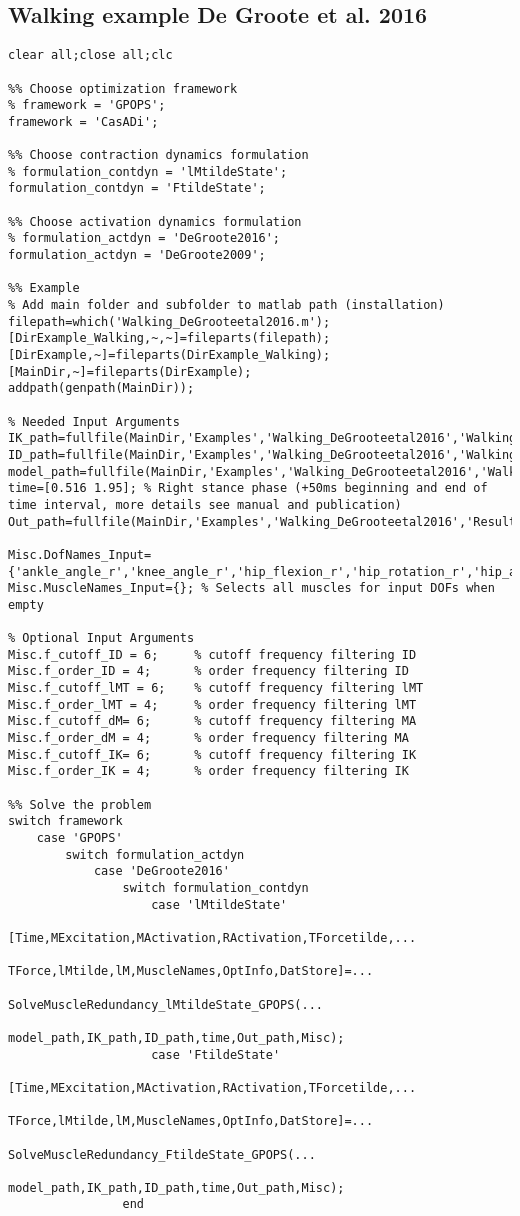 \documentclass[a4paper,oneside,11pt]{article}
\begin{document}
\subsection{Walking example De Groote et al. 2016}
\begin{lstlisting}[frame=none,basicstyle=\tiny]
clear all;close all;clc

%% Choose optimization framework
% framework = 'GPOPS';
framework = 'CasADi';

%% Choose contraction dynamics formulation
% formulation_contdyn = 'lMtildeState';
formulation_contdyn = 'FtildeState';

%% Choose activation dynamics formulation
% formulation_actdyn = 'DeGroote2016';
formulation_actdyn = 'DeGroote2009';

%% Example
% Add main folder and subfolder to matlab path (installation)
filepath=which('Walking_DeGrooteetal2016.m');
[DirExample_Walking,~,~]=fileparts(filepath); 
[DirExample,~]=fileparts(DirExample_Walking);
[MainDir,~]=fileparts(DirExample);
addpath(genpath(MainDir));

% Needed Input Arguments
IK_path=fullfile(MainDir,'Examples','Walking_DeGrooteetal2016','WalkingData','Walking_IK.mot');
ID_path=fullfile(MainDir,'Examples','Walking_DeGrooteetal2016','WalkingData','Walking_ID.sto');
model_path=fullfile(MainDir,'Examples','Walking_DeGrooteetal2016','WalkingData','subject1.osim');
time=[0.516 1.95]; % Right stance phase (+50ms beginning and end of time interval, more details see manual and publication)
Out_path=fullfile(MainDir,'Examples','Walking_DeGrooteetal2016','Results');

Misc.DofNames_Input={'ankle_angle_r','knee_angle_r','hip_flexion_r','hip_rotation_r','hip_adduction_r'};
Misc.MuscleNames_Input={}; % Selects all muscles for input DOFs when empty

% Optional Input Arguments
Misc.f_cutoff_ID = 6;     % cutoff frequency filtering ID
Misc.f_order_ID = 4;      % order frequency filtering ID
Misc.f_cutoff_lMT = 6;    % cutoff frequency filtering lMT
Misc.f_order_lMT = 4;     % order frequency filtering lMT
Misc.f_cutoff_dM= 6;      % cutoff frequency filtering MA
Misc.f_order_dM = 4;      % order frequency filtering MA
Misc.f_cutoff_IK= 6;      % cutoff frequency filtering IK
Misc.f_order_IK = 4;      % order frequency filtering IK

%% Solve the problem
switch framework
    case 'GPOPS'
        switch formulation_actdyn
            case 'DeGroote2016'     
                switch formulation_contdyn
                    case 'lMtildeState'
                        [Time,MExcitation,MActivation,RActivation,TForcetilde,...
                            TForce,lMtilde,lM,MuscleNames,OptInfo,DatStore]=...
                            SolveMuscleRedundancy_lMtildeState_GPOPS(...
                            model_path,IK_path,ID_path,time,Out_path,Misc);
                    case 'FtildeState'   
                        [Time,MExcitation,MActivation,RActivation,TForcetilde,...
                            TForce,lMtilde,lM,MuscleNames,OptInfo,DatStore]=...
                            SolveMuscleRedundancy_FtildeState_GPOPS(...
                            model_path,IK_path,ID_path,time,Out_path,Misc);
                end


\end{lstlisting}
\end{document}
